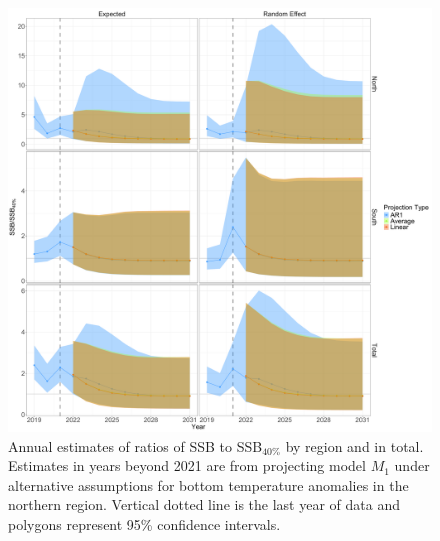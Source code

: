 \documentclass[
]{article}
\begin{document}
\begin{figure}

{\centering \includegraphics[height=0.95\textheight]{proj_SSB_status_results} 

}

\caption{Annual estimates of ratios of SSB to SSB$_{40\%}$ by region and in total. Estimates in years beyond 2021 are from projecting model $M_1$ under alternative assumptions for bottom temperature anomalies in the northern region. Vertical dotted line is the last year of data and polygons represent 95\% confidence intervals.}\label{fig:SSB-status-proj}
\end{figure}
\end{document}
